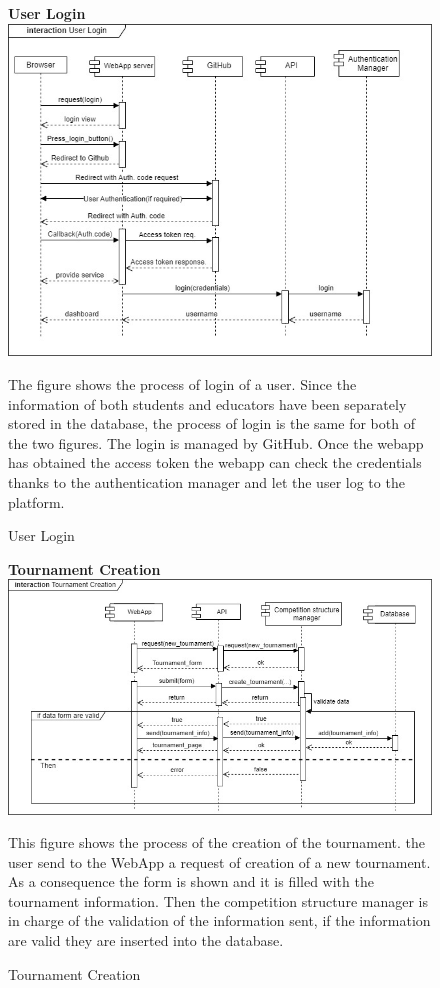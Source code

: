 \begin{enumerate}[label=\textbf{[UC\arabic*]}]
    \begin{figure}
    \item \textbf{User Login}
        \centering
        \includegraphics[width= \textwidth]{Images/User_login (1).jpg}
        \caption{User Login}
        \label{fig:enter-label}
        \raggedright The figure shows the process of login of a user. Since the information of both students and educators have been separately stored in the database, the process of login is the same for both of the two figures. 
        The login is managed by GitHub. Once the webapp has obtained the access token the webapp can check the credentials thanks to the authentication manager and let the user log to the platform.
    \end{figure}

    \begin{figure}
    \item \textbf{Tournament Creation}
        \centering
        \includegraphics[width= \textwidth]{Images/Tournament_creation.jpg}
        \caption{Tournament Creation}
        \label{fig:enter-label}
        \raggedright This figure shows the process of the creation of the tournament. the user send to the WebApp  a request of creation of a new tournament. As a consequence the form is shown and it is filled with the tournament information. Then the competition structure manager is in charge of the validation of the information sent, if the information are valid they are inserted into the database.
    \end{figure}
    

\end{enumerate}
